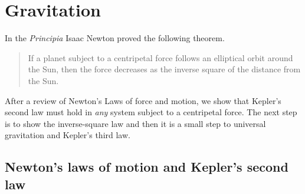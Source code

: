 

\chapter{Gravitation}\label{s.newton}

In the \textit{Principia} Isaac Newton proved the following theorem.
\begin{quote}
\begin{theorem}
If a planet subject to a centripetal force follows an elliptical orbit around the Sun, then the force decreases as the inverse square of the distance from the Sun.
\end{theorem}
\end{quote}
After a review of Newton's Laws of force and motion,  we show that Kepler's second law must hold in \emph{any} system subject to a centripetal force. The next step is to show the inverse-square law and then it is a small step to universal gravitation and Kepler's third law.

\section{Newton's laws of motion and Kepler's second law}


